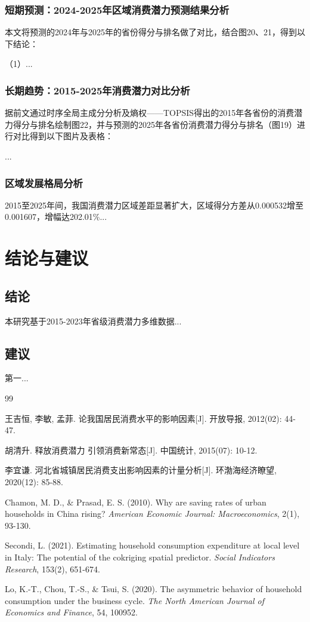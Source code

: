 \documentclass[UTF8,a4paper,zihao=-4,AutoFakeBold]{ctexart}
\begin{document}
    \subsubsection{短期预测：2024-2025年区域消费潜力预测结果分析}
    本文将预测的2024年与2025年的省份得分与排名做了对比，结合图20、21，得到以下结论：
    
    （1）...
     
     
     \subsubsection{长期趋势：2015-2025年消费潜力对比分析}
     据前文通过时序全局主成分分析及熵权——TOPSIS得出的2015年各省份的消费潜力得分与排名绘制图22，并与预测的2025年各省份消费潜力得分与排名（图19）进行对比得到以下图片及表格：
    
   ...
    
    \subsubsection{区域发展格局分析}
    2015至2025年间，我国消费潜力区域差距显著扩大，区域得分方差从0.000532增至0.001607，增幅达202.01\%...
    
    \section{结论与建议}
    \subsection{结论}
    本研究基于2015-2023年省级消费潜力多维数据...
    
    \subsection{建议}
    第一...
    
    \newpage
\begin{thebibliography}{99}
	
	
	王吉恒, 李敏, 孟菲. 论我国居民消费水平的影响因素[J]. 开放导报, 2012(02): 44-47.
	
	胡清升. 释放消费潜力 引领消费新常态[J]. 中国统计, 2015(07): 10-12.
	
	李宜谦. 河北省城镇居民消费支出影响因素的计量分析[J]. 环渤海经济瞭望, 2020(12): 85-88.
	
	Chamon, M. D., \& Prasad, E. S. (2010). Why are saving rates of urban households in China rising? \textit{American Economic Journal: Macroeconomics}, 2(1), 93-130.
	
	Secondi, L. (2021). Estimating household consumption expenditure at local level in Italy: The potential of the cokriging spatial predictor. \textit{Social Indicators Research}, 153(2), 651-674.
	
	Lo, K.-T., Chou, T.-S., \& Tsui, S. (2020). The asymmetric behavior of household consumption under the business cycle. \textit{The North American Journal of Economics and Finance}, 54, 100952.
	
\end{thebibliography}
\end{document}
